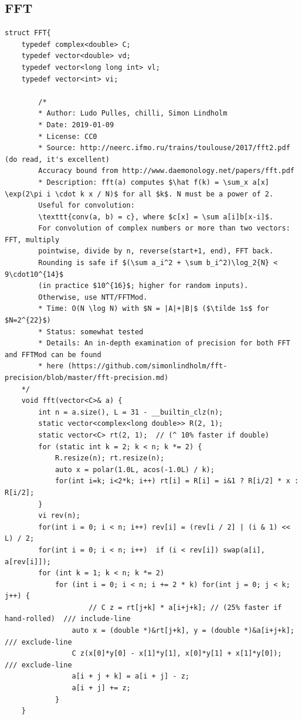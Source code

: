 \documentclass[11pt, a4paper, twoside]{article}
\begin{document}
\subsection{FFT}
\begin{verbatim}
struct FFT{
    typedef complex<double> C;
    typedef vector<double> vd;
    typedef vector<long long int> vl;
    typedef vector<int> vi;
     
        /*
        * Author: Ludo Pulles, chilli, Simon Lindholm
        * Date: 2019-01-09
        * License: CC0
        * Source: http://neerc.ifmo.ru/trains/toulouse/2017/fft2.pdf (do read, it's excellent)
        Accuracy bound from http://www.daemonology.net/papers/fft.pdf
        * Description: fft(a) computes $\hat f(k) = \sum_x a[x] \exp(2\pi i \cdot k x / N)$ for all $k$. N must be a power of 2.
        Useful for convolution:
        \texttt{conv(a, b) = c}, where $c[x] = \sum a[i]b[x-i]$.
        For convolution of complex numbers or more than two vectors: FFT, multiply
        pointwise, divide by n, reverse(start+1, end), FFT back.
        Rounding is safe if $(\sum a_i^2 + \sum b_i^2)\log_2{N} < 9\cdot10^{14}$
        (in practice $10^{16}$; higher for random inputs).
        Otherwise, use NTT/FFTMod.
        * Time: O(N \log N) with $N = |A|+|B|$ ($\tilde 1s$ for $N=2^{22}$)
        * Status: somewhat tested
        * Details: An in-depth examination of precision for both FFT and FFTMod can be found
        * here (https://github.com/simonlindholm/fft-precision/blob/master/fft-precision.md)
    */
    void fft(vector<C>& a) {
        int n = a.size(), L = 31 - __builtin_clz(n);
        static vector<complex<long double>> R(2, 1);
        static vector<C> rt(2, 1);  // (^ 10% faster if double)
        for (static int k = 2; k < n; k *= 2) {
            R.resize(n); rt.resize(n);
            auto x = polar(1.0L, acos(-1.0L) / k);
            for(int i=k; i<2*k; i++) rt[i] = R[i] = i&1 ? R[i/2] * x : R[i/2];
        }
        vi rev(n);
        for(int i = 0; i < n; i++) rev[i] = (rev[i / 2] | (i & 1) << L) / 2;
        for(int i = 0; i < n; i++)  if (i < rev[i]) swap(a[i], a[rev[i]]);
        for (int k = 1; k < n; k *= 2)
            for (int i = 0; i < n; i += 2 * k) for(int j = 0; j < k; j++) {
                    // C z = rt[j+k] * a[i+j+k]; // (25% faster if hand-rolled)  /// include-line
                auto x = (double *)&rt[j+k], y = (double *)&a[i+j+k];        /// exclude-line
                C z(x[0]*y[0] - x[1]*y[1], x[0]*y[1] + x[1]*y[0]);           /// exclude-line
                a[i + j + k] = a[i + j] - z;
                a[i + j] += z;
            }
    }
        

\end{verbatim}
\end{document}
